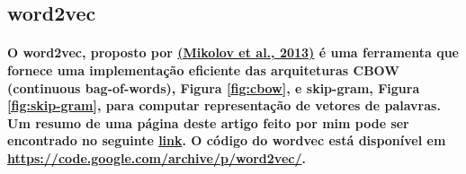 \documentclass[a4paper]{article}    %
\begin{document}
\subsection{word2vec}

\paragraph{O word2vec, proposto por \href{https://github.com/ito-rafael/machine-learning/blob/master/papers/NLP/2013\%20-\%20\%5Bword2vec\%5D\%20Efficient\%20Estimation\%20of\%20Word\%20Representations\%20in\%20Vector\%20Space\%20\%5BGoogle\%20Inc\%5D.pdf}{(Mikolov et al., 2013)} é uma ferramenta que fornece uma implementação eficiente das arquiteturas CBOW (continuous bag-of-words), Figura \ref{fig:cbow}, e skip-gram, Figura \ref{fig:skip-gram}, para computar representação de vetores de palavras. Um resumo de uma página deste artigo feito por mim pode ser encontrado no seguinte \href{https://github.com/ito-rafael/machine-learning/blob/master/one-page\%20papers\%20summary/2013\%20-\%20\%5Bword2vec\%5D\%20Efficient\%20Estimation\%20of\%20Word\%20Representations\%20in\%20Vector\%20Space\%20\%5BGoogle\%20Inc\%5D.pdf}{link}. O código do wordvec está disponível em \href{https://code.google.com/archive/p/word2vec/}{https://code.google.com/archive/p/word2vec/}.}

\graphicspath{{../figures/Q10/}}
\end{document}
